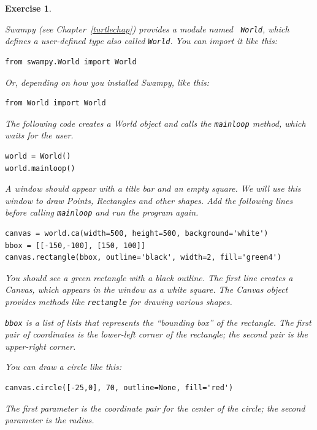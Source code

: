 \documentclass[12pt,a4paper,final,twoside,onecolumn,titlepage]{book}
\newtheorem{exercise}{Exercise}[chapter]
\begin{document}
\begin{exercise}
\label{canvas}

Swampy (see Chapter~\ref{turtlechap}) provides a module named {\tt
  World}, which defines a user-defined type also called {\tt World}.
You can import it like this:

\begin{verbatim}
from swampy.World import World
\end{verbatim}

Or, depending on how you installed Swampy, like this:

\begin{verbatim}
from World import World
\end{verbatim}

The following code creates a World object and calls
the {\tt mainloop} method, which
waits for the user.

\begin{verbatim}
world = World()
world.mainloop()
\end{verbatim}

A window should appear with a title bar and an empty square.
We will use this window to draw Points,
Rectangles and other shapes.  
Add the following lines before calling
\verb"mainloop" and run the program again.

\begin{verbatim}
canvas = world.ca(width=500, height=500, background='white')
bbox = [[-150,-100], [150, 100]]
canvas.rectangle(bbox, outline='black', width=2, fill='green4')
\end{verbatim}

You should see a green rectangle with a black outline.
The first line creates a Canvas, which appears in the window
as a white square.  The Canvas object provides methods like
{\tt rectangle} for drawing various shapes.

{\tt bbox} is a list of lists that represents the ``bounding box''
of the rectangle.  The first pair of coordinates is the lower-left
corner of the rectangle; the second pair is the upper-right corner.

You can draw a circle like this:

\begin{verbatim}
canvas.circle([-25,0], 70, outline=None, fill='red')
\end{verbatim}

The first parameter is the coordinate pair for the center of the
circle; the second parameter is the radius.


\end{exercise}
\end{document}
